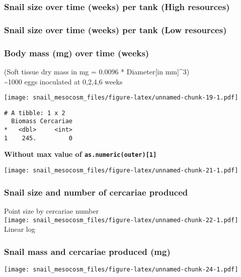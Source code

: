 \documentclass[10,portrait]{article}
\begin{document}
\subsubsection{Snail size over time (weeks) per tank (High
resources)}\label{snail-size-over-time-weeks-per-tank-high-resources}

\subsubsection{Snail size over time (weeks) per tank (Low
resources)}\label{snail-size-over-time-weeks-per-tank-low-resources}

\subsubsection{Body mass (mg) over time
(weeks)}\label{body-mass-mg-over-time-weeks}

(Soft tissue dry mass in mg = 0.0096 * Diameter{[}in mm{]}\^{}3)\\
\textasciitilde{}1000 eggs inoculated at 0,2,4,6 weeks

\texttt{[image: snail\_mesocosm\_files/figure-latex/unnamed-chunk-19-1.pdf]}

\begin{verbatim}
# A tibble: 1 x 2
  Biomass Cercariae
*   <dbl>     <int>
1    245.         0
\end{verbatim}

\textbf{Without max value of \texttt{as.numeric(outer){[}1{]}}}

\texttt{[image: snail\_mesocosm\_files/figure-latex/unnamed-chunk-21-1.pdf]}

\subsubsection{Snail size and number of cercariae
produced}\label{snail-size-and-number-of-cercariae-produced}

Point size by cercariae number\\
\texttt{[image: snail\_mesocosm\_files/figure-latex/unnamed-chunk-22-1.pdf]}
Linear log

\subsubsection{Snail mass and cercariae produced
(mg)}\label{snail-mass-and-cercariae-produced-mg}

\texttt{[image: snail\_mesocosm\_files/figure-latex/unnamed-chunk-24-1.pdf]}
\end{document}
